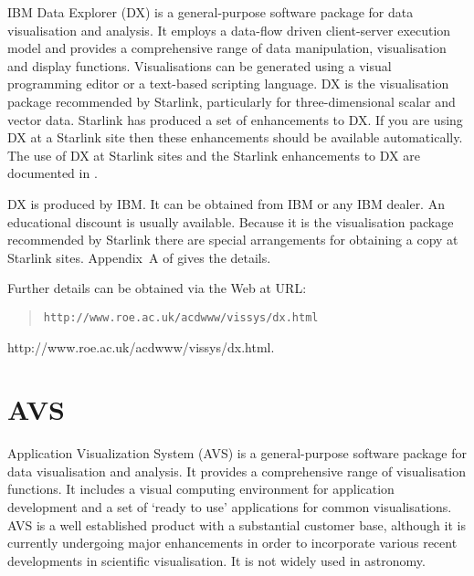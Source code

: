 IBM Data Explorer (DX) is a general-purpose software package for data
visualisation and analysis. It employs a data-flow driven client-server
execution model and provides a comprehensive range of data manipulation,
visualisation and display functions. Visualisations can be generated
using a visual programming editor or a text-based scripting language.
DX is the visualisation package recommended by Starlink, particularly
for three-dimensional scalar and vector data. Starlink has produced a
set of enhancements to DX. If you are using DX at a Starlink site then
these enhancements should be available automatically. The use of DX at
Starlink sites and the Starlink enhancements to DX are documented in
\cite{SUN203}.

DX is produced by IBM. It can be obtained from IBM or any IBM dealer. 
An educational discount is usually available. Because it is the 
visualisation package recommended by Starlink there are special
arrangements for obtaining a copy at Starlink sites. Appendix~A of
\cite{SUN203} gives the details.

\begin{latex}
Further details can be obtained via the Web at URL:

\begin{quote}
{\tt http://www.roe.ac.uk/acdwww/vissys/dx.html}
\end{quote}
\end{latex}

\begin{htmlonly}
{http://www.roe.ac.uk/acdwww/vissys/dx.html}.
\end{htmlonly}


\section{AVS \label{AVS}  }

Application Visualization System (AVS) is a general-purpose software 
package for data visualisation and analysis. It provides a comprehensive
range of visualisation functions. It includes a visual computing
environment for application development and a set of `ready to use'
applications for common visualisations. AVS is a well established
product with a substantial customer base, although it is currently
undergoing major enhancements in order to incorporate various recent
developments in scientific visualisation. It is not widely used in
astronomy.

